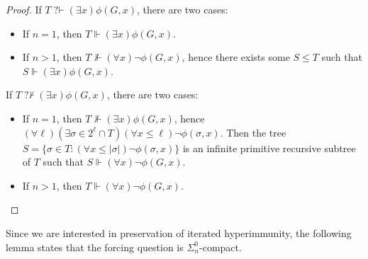 \documentclass{article}
\def\TT{\mathbb{T}}
\newcommand{\qvdash}{\operatorname{{?}{\vdash}}}
\newcommand{\nqvdash}{\operatorname{{?}{\nvdash}}}
\numberwithin{theorem}{section}
\newtheorem{lemma}[theorem]{Lemma}
\theoremstyle{definition}
\begin{document}
\begin{proof}
If $T \qvdash (\exists x)\phi(G,x)$, there are two cases:
\begin{itemize}
    \item If $n = 1$, then $T \Vdash (\exists x)\phi(G,x)$.
    \item If $n > 1$, then $T \not \Vdash (\forall x) \neg \phi(G,x)$, hence there exists some $S \leq T$ such that $S \Vdash (\exists x) \phi(G,x)$.
\end{itemize}
If $T \nqvdash (\exists x)\phi(G,x)$, there are two cases:
\begin{itemize}
    \item If $n = 1$, then $T \not \Vdash (\exists x)\phi(G,x)$, hence $(\forall \ell)(\exists \sigma \in 2^{\ell} \cap T)(\forall x \leq \ell) \neg \phi(\sigma,x)$. Then the tree $S = \{\sigma \in T : (\forall x \leq |\sigma|) \neg \phi(\sigma,x) \}$ is an infinite primitive recursive subtree of $T$ such that $S \Vdash (\forall x) \neg \phi(G,x)$.
    \item If $n > 1$, then $T \Vdash (\forall x) \neg \phi(G,x)$.
\end{itemize}
\end{proof}

Since we are interested in preservation of iterated hyperimmunity, the following lemma states that the forcing question is $\Sigma^0_n$-compact.
\end{document}
